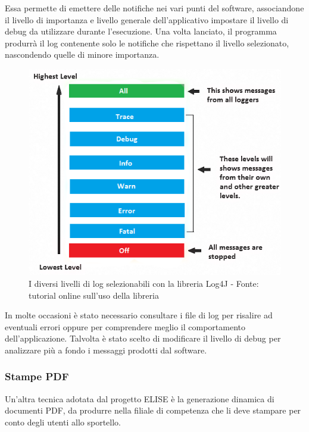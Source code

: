 	Essa permette di emettere delle notifiche nei vari punti del software, associandone il livello di importanza e livello generale dell'applicativo impostare il livello di debug da utilizzare durante l'esecuzione. Una volta lanciato, il programma produrrà il log contenente solo le notifiche che rispettano il livello selezionato, nascondendo quelle di minore importanza.\\
	
	\begin{figure}[H]
		\centering
	   	\includegraphics[width=1\textwidth]{immagini/log_levels}
	   	\caption{I diversi livelli di log selezionabili con la libreria Log4J - Fonte: tutorial online sull'uso della libreria}
	\end{figure}	
	
	In molte occasioni è stato necessario consultare i file di log per risalire ad eventuali errori oppure per comprendere meglio il comportamento dell'applicazione. Talvolta è stato scelto di modificare il livello di debug per analizzare più a fondo i messaggi prodotti dal software.
	
	\subsubsection{Stampe PDF}	
	Un'altra tecnica adotata dal progetto ELISE è la generazione dinamica di documenti PDF, da produrre nella filiale di competenza che li deve stampare per conto degli utenti allo	sportello.\\
	
